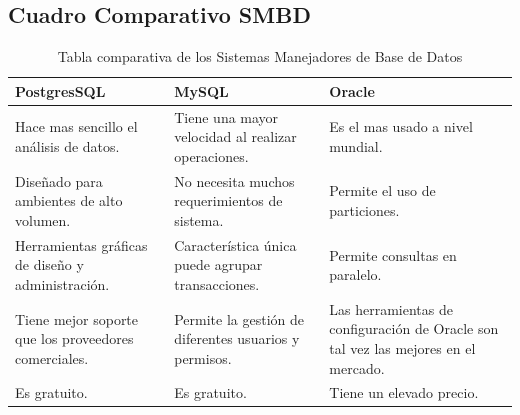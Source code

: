 \newpage
\subsection{Cuadro Comparativo SMBD}

\begin{table}[H]	
\begin{center}
\begin{tabular}{ | m{4cm} | m{4cm}| m{4cm}| } 
 \hline
 PostgresSQL & MySQL & Oracle \\
 \hline
 Hace mas sencillo el análisis de datos.
 &
 Tiene una mayor velocidad al realizar operaciones.
 & 
 Es el mas usado a nivel mundial.\\
 \hline
 Diseñado para ambientes de alto volumen.
 & 
 No necesita muchos requerimientos de sistema.
 & 
 Permite el uso de particiones.\\
 \hline
 Herramientas gráficas de diseño y administración.
 & 
 Característica única puede agrupar transacciones.
 & 
 Permite consultas en paralelo.\\
 \hline
 Tiene mejor soporte que los proveedores comerciales.
 & 
 Permite la gestión de diferentes usuarios y permisos.
 & 
 Las herramientas de configuración de Oracle son tal vez las mejores en el mercado.\\
 \hline
 Es gratuito.
 & 
 Es gratuito.
 & 
 Tiene un elevado precio.\\
 \hline
 \end{tabular}
\caption{Tabla comparativa de los Sistemas Manejadores de Base de Datos}
\label{Tabla:3}
\end{center}
\end{table}	







